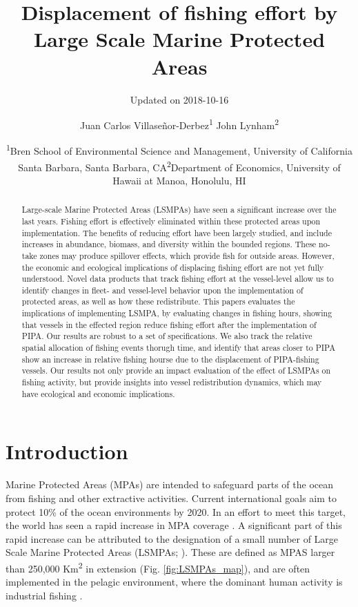 \documentclass[11pt,]{article}
\title{Displacement of fishing effort by Large Scale Marine Protected Areas}
\subtitle{Updated on 2018-10-16}
\author{Juan Carlos Villaseñor-Derbez\textsuperscript{1} John
Lynham\textsuperscript{2}}
\date{\textsuperscript{1}Bren School of Environmental Science and Management,
University of California Santa Barbara, Santa Barbara,
CA\newline \textsuperscript{2}Department of Economics, University of
Hawaii at Manoa, Honolulu, HI}
\begin{document}
\maketitle
\begin{abstract}
Large-scale Marine Protected Areas (LSMPAs) have seen a significant
increase over the last years. Fishing effort is effectively eliminated
within these protected areas upon implementation. The benefits of
reducing effort have been largely studied, and include increases in
abundance, biomass, and diversity within the bounded regions. These
no-take zones may produce spillover effects, which provide fish for
outside areas. However, the economic and ecological implications of
displacing fishing effort are not yet fully understood. Novel data
products that track fishing effort at the vessel-level allow us to
identify changes in fleet- and vessel-level behavior upon the
implementation of protected areas, as well as how these redistribute.
This papers evaluates the implications of implementing LSMPA, by
evaluating changes in fishing hours, showing that vessels in the
effected region reduce fishing effort after the implementation of PIPA.
Our results are robust to a set of specifications. We also track the
relative spatial allocation of fishing events thorugh time, and identify
that areas closer to PIPA show an increase in relative fishing hourse
due to the displacement of PIPA-fishing vessels. Our results not only
provide an impact evaluation of the effect of LSMPAs on fishing
activity, but provide insights into vessel redistribution dynamics,
which may have ecological and economic implications.
\end{abstract}

\hypertarget{introduction}{%
\section{Introduction}\label{introduction}}

Marine Protected Areas (MPAs) are intended to safeguard parts of the
ocean from fishing and other extractive activities. Current
international goals aim to protect 10\% of the ocean environments by
2020. In an effort to meet this target, the world has seen a rapid
increase in MPA coverage \citep{wood_2008,sala_2018}. A significant part
of this rapid increase can be attributed to the designation of a small
number of Large Scale Marine Protected Areas (LSMPAs;
\citet{boonzaier_2016,singleton_2014,gray_2017}). These are defined as
MPAS larger than 250,000 Km\textsuperscript{2} in extension (Fig.
\ref{fig:LSMPAs_map}), and are often implemented in the pelagic
environment, where the dominant human activity is industrial fishing
\citep{toonen_2013,gray_2017,kroodsma_2018}.
\end{document}
